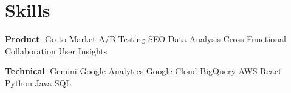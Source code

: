 

\section{Skills}
\begin{itemize}[leftmargin=0.15in, label={}, itemsep=0pt, topsep=0pt]
\small{\item{\textbf{Product}:
    Go-to-Market\hspace{0.1em}\resumeDot\hspace{0.1em}
    A/B Testing\hspace{0.1em}\resumeDot\hspace{0.1em}
    SEO\hspace{0.1em}\resumeDot\hspace{0.1em}
    Data Analysis\hspace{0.1em}\resumeDot\hspace{0.1em}
    Cross-Functional Collaboration\hspace{0.1em}\resumeDot\hspace{0.1em}
    User Insights
}}

\small{\item{\textbf{Technical}:
    Gemini\hspace{0.1em}\resumeDot\hspace{0.1em}
    Google Analytics\hspace{0.1em}\resumeDot\hspace{0.1em}
    Google Cloud\hspace{0.1em}\resumeDot\hspace{0.1em}
    BigQuery\hspace{0.1em}\resumeDot\hspace{0.1em}
    AWS\hspace{0.1em}\resumeDot\hspace{0.1em}
    React\hspace{0.1em}\resumeDot\hspace{0.1em}
    Python\hspace{0.1em}\resumeDot\hspace{0.1em}
    Java\hspace{0.1em}\resumeDot\hspace{0.1em}
    SQL
    }}


\end{itemize}
